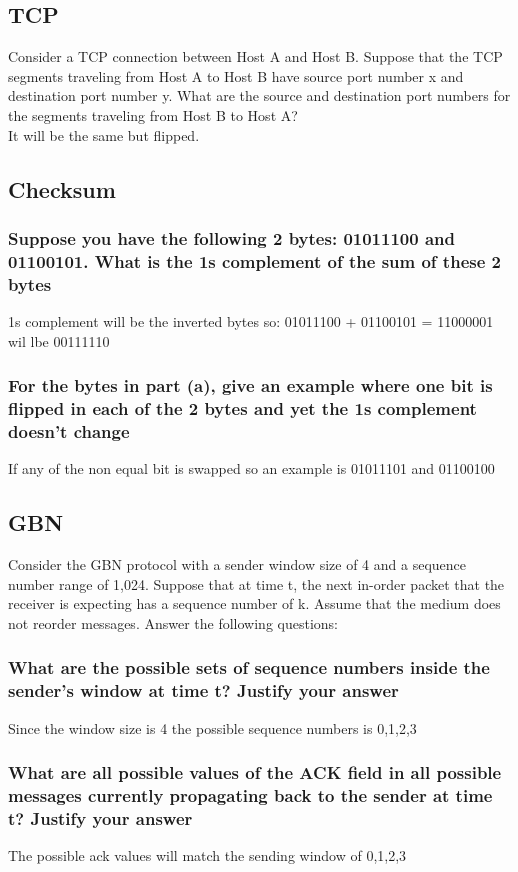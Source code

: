 \documentclass[12pt, a4paper]{article}
\begin{document}
		\subsection{TCP}
			Consider a TCP connection between Host A and Host B. Suppose that the TCP segments traveling from Host A to Host B have source port number x and destination port number y. What are the source and destination port numbers for the segments traveling from Host B to Host A?\\
			It will be the same but flipped.
		\subsection{Checksum}
			\subsubsection{ Suppose you have the following 2 bytes: 01011100 and 01100101. What is the 1s complement of the sum of these 2 bytes}
				1s complement will be the inverted bytes so: 01011100 + 01100101 = 11000001 wil lbe 00111110
			\subsubsection{For the bytes in part (a), give an example where one bit is flipped in each of the 2 bytes and yet the 1s complement doesn’t change}
				If any of the non equal bit is swapped so an example is 01011101 and 01100100
		\subsection{GBN}
			Consider the GBN protocol with a sender window size of 4 and a sequence number range of 1,024. Suppose that at time t, the next in-order packet that the receiver is expecting has a sequence number of k. Assume that the medium does not reorder messages. Answer the following questions:
				\subsubsection{ What are the possible sets of sequence numbers inside the sender’s window at time t? Justify your answer}
					Since the window size is 4 the possible sequence numbers is 0,1,2,3
				\subsubsection{What are all possible values of the ACK field in all possible messages currently propagating back to the sender at time t? Justify your answer}
					The possible ack values will match the sending window of 0,1,2,3
\end{document}
